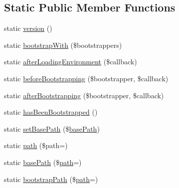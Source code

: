 \subsection*{Static Public Member Functions}
\begin{DoxyCompactItemize}
\item 
static \mbox{\hyperlink{class_illuminate_1_1_support_1_1_facades_1_1_app_af1d0616b31932a0e645e6264578a0243}{version}} ()
\item 
static \mbox{\hyperlink{class_illuminate_1_1_support_1_1_facades_1_1_app_a1397831bdc0a4d82c50c7435921d5053}{bootstrap\+With}} (\$bootstrappers)
\item 
static \mbox{\hyperlink{class_illuminate_1_1_support_1_1_facades_1_1_app_ad816001ccc8ba065c0eae100cb6de95f}{after\+Loading\+Environment}} (\$callback)
\item 
static \mbox{\hyperlink{class_illuminate_1_1_support_1_1_facades_1_1_app_a64563b5cc0a5d3a49f7eb6bc35c7e91a}{before\+Bootstrapping}} (\$bootstrapper, \$callback)
\item 
static \mbox{\hyperlink{class_illuminate_1_1_support_1_1_facades_1_1_app_a3aa4c683656337cf979b4552f69eca96}{after\+Bootstrapping}} (\$bootstrapper, \$callback)
\item 
static \mbox{\hyperlink{class_illuminate_1_1_support_1_1_facades_1_1_app_aa21c13916407cbc1db73a02d7c925ddf}{has\+Been\+Bootstrapped}} ()
\item 
static \mbox{\hyperlink{class_illuminate_1_1_support_1_1_facades_1_1_app_a13a02a2a5d8d2f2b54acfac91ad92fdd}{set\+Base\+Path}} (\$\mbox{\hyperlink{class_illuminate_1_1_support_1_1_facades_1_1_app_a144d9307a519b47a6f26f97cf761388c}{base\+Path}})
\item 
static \mbox{\hyperlink{class_illuminate_1_1_support_1_1_facades_1_1_app_a7200f5a02f461cd9329772f8fbffd35c}{path}} (\$path=\textquotesingle{}\textquotesingle{})
\item 
static \mbox{\hyperlink{class_illuminate_1_1_support_1_1_facades_1_1_app_a144d9307a519b47a6f26f97cf761388c}{base\+Path}} (\$\mbox{\hyperlink{class_illuminate_1_1_support_1_1_facades_1_1_app_a7200f5a02f461cd9329772f8fbffd35c}{path}}=\textquotesingle{}\textquotesingle{})
\item 
static \mbox{\hyperlink{class_illuminate_1_1_support_1_1_facades_1_1_app_a64bbb4c2fa9f4b9f064e1d30fe9633d2}{bootstrap\+Path}} (\$\mbox{\hyperlink{class_illuminate_1_1_support_1_1_facades_1_1_app_a7200f5a02f461cd9329772f8fbffd35c}{path}}=\textquotesingle{}\textquotesingle{})
\item 

\end{DoxyCompactItemize}
